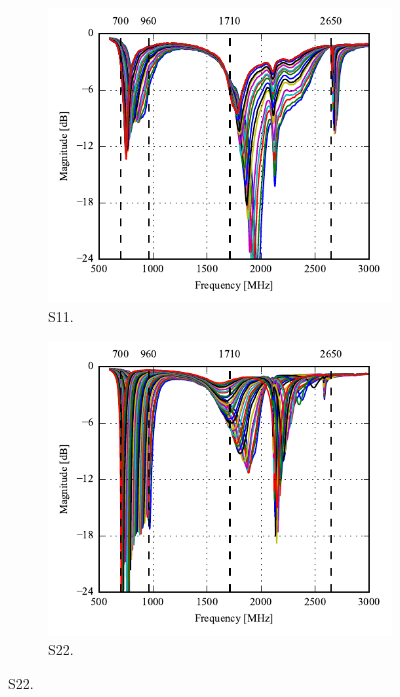 \begin{figure}[htbp]
    \centering
    \begin{subfigure}{0.49\linewidth}
        \includegraphics{img/tech_sol/monopole/highband/meas/final_tuner/S11.pdf}
        \caption{S11.}
    \end{subfigure}
    \hfill
    \begin{subfigure}{0.49\linewidth}
        \includegraphics{img/tech_sol/monopole/highband/meas/final_tuner/S22.pdf}
        \caption{S22.}

\end{subfigure}
\end{figure}
